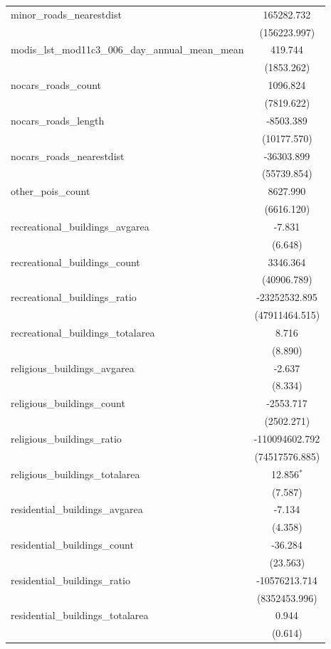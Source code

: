 \begin{table}[!htbp]
\begin{tabular}{@{\extracolsep{5pt}}lc}
 minor_roads_nearestdist & 165282.732$^{}$ \\
  & (156223.997) \\
 modis_lst_mod11c3_006_day_annual_mean_mean & 419.744$^{}$ \\
  & (1853.262) \\
 nocars_roads_count & 1096.824$^{}$ \\
  & (7819.622) \\
 nocars_roads_length & -8503.389$^{}$ \\
  & (10177.570) \\
 nocars_roads_nearestdist & -36303.899$^{}$ \\
  & (55739.854) \\
 other_pois_count & 8627.990$^{}$ \\
  & (6616.120) \\
 recreational_buildings_avgarea & -7.831$^{}$ \\
  & (6.648) \\
 recreational_buildings_count & 3346.364$^{}$ \\
  & (40906.789) \\
 recreational_buildings_ratio & -23252532.895$^{}$ \\
  & (47911464.515) \\
 recreational_buildings_totalarea & 8.716$^{}$ \\
  & (8.890) \\
 religious_buildings_avgarea & -2.637$^{}$ \\
  & (8.334) \\
 religious_buildings_count & -2553.717$^{}$ \\
  & (2502.271) \\
 religious_buildings_ratio & -110094602.792$^{}$ \\
  & (74517576.885) \\
 religious_buildings_totalarea & 12.856$^{*}$ \\
  & (7.587) \\
 residential_buildings_avgarea & -7.134$^{}$ \\
  & (4.358) \\
 residential_buildings_count & -36.284$^{}$ \\
  & (23.563) \\
 residential_buildings_ratio & -10576213.714$^{}$ \\
  & (8352453.996) \\
 residential_buildings_totalarea & 0.944$^{}$ \\
  & (0.614) \\

\end{tabular}
\end{table}
